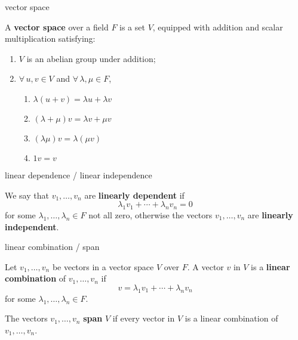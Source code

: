 \documentclass[avery5371,grid]{flashcards}
\newcommand{\defn}[1]{\textbf{#1}}
\begin{document}
\begin{flashcard}[Definition]{vector space}

  A \defn{vector space} over a field $F$ is a set $V$, equipped with
  addition and scalar multiplication satisfying:
  \begin{enumerate}
  \item $V$ is an abelian group under addition;
  \item $\forall \, u,v \in V$ and $\forall \, \lambda, \mu \in F$,
    \begin{enumerate}
    \item $\lambda(u + v) = \lambda u + \lambda v$
    \item $(\lambda + \mu)v = \lambda v + \mu v$
    \item $(\lambda \mu) v = \lambda (\mu v)$
    \item $1 v = v$
    \end{enumerate}
  \end{enumerate}

\end{flashcard}

\begin{flashcard}[Definition]{linear dependence / linear independence}

  We say that $v_1, \ldots, v_n$ are \defn{linearly dependent} if
  \[
    \lambda_1 v_1 + \cdots + \lambda_n v_n = 0
  \]
  for some $\lambda_1, \ldots, \lambda_n \in F$ not all zero,
  otherwise the vectors $v_1, \ldots, v_n$ are \defn{linearly
    independent}. 
\end{flashcard}

\begin{flashcard}[Definition]{linear combination / span}

  Let $v_1, \ldots, v_n$ be vectors in a vector space $V$ over $F$. A
  vector $v$ in $V$ is a \defn{linear combination} of
  $v_1, \ldots, v_n$ if
  \[
    v = \lambda_1 v_1 + \cdots + \lambda_n v_n
  \]
  for some $\lambda_1, \ldots, \lambda_n \in F$.
  \vfill

  The vectors $v_1, \ldots, v_n$ \defn{span} $V$ if every vector in
  $V$ is a linear combination of $v_1, \ldots, v_n$.

\end{flashcard}
\end{document}
